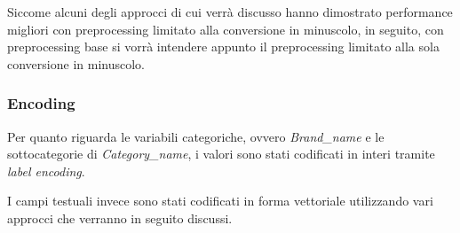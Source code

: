 Siccome alcuni degli approcci di cui verrà discusso hanno dimostrato performance migliori
con preprocessing limitato alla conversione in minuscolo, in seguito, con
preprocessing base si vorrà intendere appunto il preprocessing limitato alla sola
conversione in minuscolo.

\subsubsection{Encoding}

Per quanto riguarda le variabili categoriche, ovvero \textit{Brand\_name} e le
sottocategorie di \textit{Category\_name},
i valori sono stati codificati in interi tramite \textit{label encoding}.

I campi testuali invece sono stati codificati in forma vettoriale utilizzando
vari approcci che verranno in seguito discussi.


